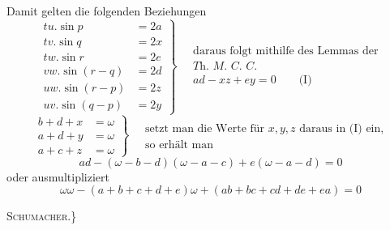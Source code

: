 %
\par
Damit gelten die folgenden Beziehungen
\[
\left.\begin{aligned}
tu.\sin p&=2a\\ tv.\sin q&=2x\\ tw.\sin r&=2e\\
vw.\sin(r-q)&=2d\\ uw.\sin(r-p)&=2z\\ uv.\sin(q-p)&=2y
\end{aligned}\right\}\quad
\begin{gathered}\text{daraus folgt mithilfe des Lemmas der}\\
\textit{Th. M. C. C.}\\ ad-xz+ey=0\qquad\text{(I)}\end{gathered}
\]
\begingroup\small
\[
\left.\begin{aligned}b+d+x&=\omega\\a+d+y&=\omega\\a+c+z&=\omega\end{aligned}\right\}\quad
\begin{gathered}\text{setzt man die Werte für }x,y,z\text{ daraus in (I) ein,}\\\text{so erhält man}\end{gathered}
\]
\endgroup
\[ad-(\omega-b-d)(\omega-a-c)+e(\omega-a-d)=0\]
oder ausmultipliziert
\[\omega\omega-(a+b+c+d+e)\omega+(ab+bc+cd+de+ea)=0\]
\begin{flushright}\textsc{Schumacher}.\}\end{flushright}
